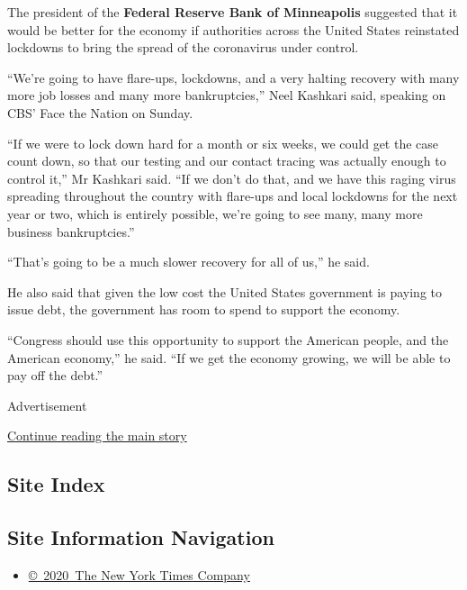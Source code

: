 The president of the \textbf{Federal Reserve Bank of Minneapolis}
suggested that it would be better for the economy if authorities across
the United States reinstated lockdowns to bring the spread of the
coronavirus under control.

``We're going to have flare-ups, lockdowns, and a very halting recovery
with many more job losses and many more bankruptcies,'' Neel Kashkari
said, speaking on CBS' Face the Nation on Sunday.

``If we were to lock down hard for a month or six weeks, we could get
the case count down, so that our testing and our contact tracing was
actually enough to control it,'' Mr Kashkari said. ``If we don't do
that, and we have this raging virus spreading throughout the country
with flare-ups and local lockdowns for the next year or two, which is
entirely possible, we're going to see many, many more business
bankruptcies.''

``That's going to be a much slower recovery for all of us,'' he said.

He also said that given the low cost the United States government is
paying to issue debt, the government has room to spend to support the
economy.

``Congress should use this opportunity to support the American people,
and the American economy,'' he said. ``If we get the economy growing, we
will be able to pay off the debt.''

Advertisement

\protect\hyperlink{after-bottom}{Continue reading the main story}

\hypertarget{site-index}{%
\subsection{Site Index}\label{site-index}}

\hypertarget{site-information-navigation}{%
\subsection{Site Information
Navigation}\label{site-information-navigation}}

\begin{itemize}
\tightlist
\item
  \href{https://help.nytimes.com/hc/en-us/articles/115014792127-Copyright-notice}{©~2020~The
  New York Times Company}
\end{itemize}

